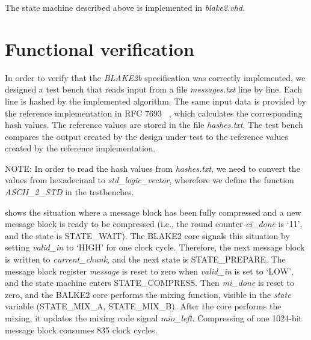 \documentclass[%
	a4paper,
]
{article}
\begin{document}
\noindent
The state machine described above is implemented in \emph{blake2.vhd}.
%
%
\section{Functional verification}
\label{sec:functional-verification}

In order to verify that the \emph{BLAKE2b} specification was correctly
implemented, we designed a test bench that reads input from a file
\emph{messages.txt} line by line.
%
Each line is hashed by the implemented algorithm. The same input
data is provided by the reference implementation in RFC 7693~%
\autocite{rfc7693}, which calculates the corresponding hash values. The
reference values are stored in the file \emph{hashes.txt}.
%
The test bench compares the output created by the design under test to
the reference values created by the reference implementation.
%

NOTE: In order to read the hash values from \emph{hashes.txt}, we need to
convert the values from hexadecimal to \emph{std_logic_vector}, wherefore
we define the function \emph{ASCII_2_STD} in the testbenches.

 shows the situation where a message block has been fully
compressed and a new message block is ready to be compressed (i.e., the round
counter \emph{ci_done} is `11', and the state is \mbox{STATE_WAIT}).
%
The BLAKE2 core signals this situation by setting \emph{valid_in} to `HIGH'
for one clock cycle.
%
Therefore, the next message block is written to \emph{current_chunk}, and the
next state is \mbox{STATE_PREPARE}. The message block register \emph{message}
is reset to zero when \emph{valid_in} is set to `LOW', and the state machine
enters \mbox{STATE_COMPRESS}.
%
Then \emph{mi_done} is reset to zero, and the BALKE2 core performs the mixing
function, visible in the \emph{state} variable (\mbox{STATE_MIX_A},
\mbox{STATE_MIX_B}). After the core performs the mixing, it updates the mixing
code signal \emph{mio\_left}.
%
Compressing of one 1024-bit message block consumes 835 clock cycles.
\end{document}
